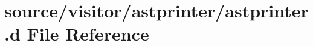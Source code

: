 \hypertarget{astprinter_8d}{
\section{source/visitor/astprinter/astprinter.d File Reference}
\label{astprinter_8d}
}
